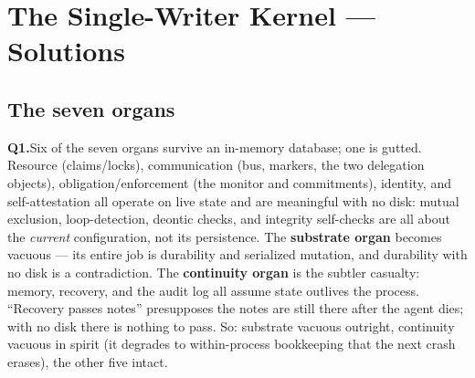 %
%

\providecommand{\wbans}[2]{%
  \par\vspace{6pt}\noindent
  {\scshape\bfseries\textcolor{hhteal}{#1.}}\enspace #2\par\vspace{2pt}%
}

\section{The Single-Writer Kernel --- Solutions}
\label{wbsol:swk}

\subsection*{The seven organs}

\wbans{Q1}{Six of the seven organs survive an in-memory database; one is gutted.
Resource (claims/locks), communication (bus, markers, the two delegation objects),
obligation/enforcement (the monitor and commitments), identity, and self-attestation
all operate on live state and are meaningful with no disk: mutual exclusion,
loop-detection, deontic checks, and integrity self-checks are all about the
\emph{current} configuration, not its persistence. The \textbf{substrate organ}
becomes vacuous --- its entire job is durability and serialized mutation, and
durability with no disk is a contradiction. The \textbf{continuity organ} is the
subtler casualty: memory, recovery, and the audit log all assume state outlives the
process. ``Recovery passes notes'' presupposes the notes are still there after the
agent dies; with no disk there is nothing to pass. So: substrate vacuous outright,
continuity vacuous in spirit (it degrades to within-process bookkeeping that the next
crash erases), the other five intact.}

